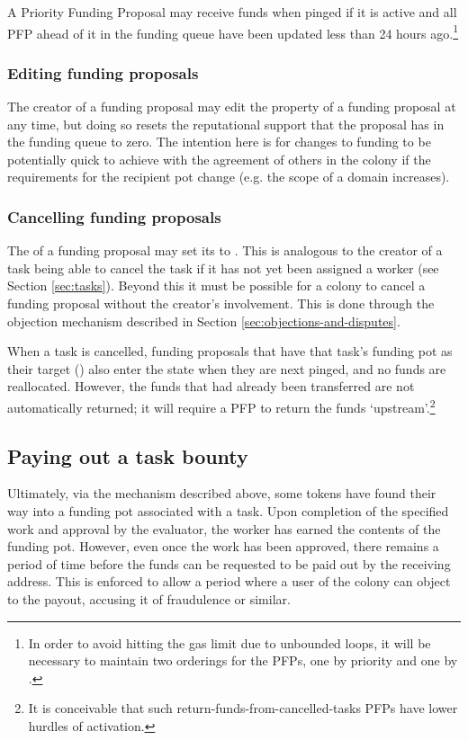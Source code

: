 A Priority Funding Proposal may receive funds when pinged if it is active and all PFP ahead of it in the funding queue have been updated less than 24 hours ago.\footnote{In order to avoid hitting the gas limit due to unbounded loops, it will be necessary to maintain two orderings for the PFPs, one by priority and one by . }

\subsubsection{Editing funding proposals}
The creator of a funding proposal may edit the  property of a funding proposal at any time, but doing so resets the reputational support that the proposal has in the funding queue to zero. The intention here is for changes to funding to be potentially quick to achieve with the agreement of others in the colony if the requirements for the recipient pot change (e.g. the scope of a domain increases).

\subsubsection{Cancelling funding proposals}
The  of a funding proposal may set its  to . This is analogous to the creator of a task being able to cancel the task if it has not yet been assigned a worker (see Section \ref{sec:tasks}). Beyond this it must be possible for a colony to cancel a funding proposal without the creator's involvement. This is done through the objection mechanism described in Section \ref{sec:objections-and-disputes}.

When a task is cancelled, funding proposals that have that task's funding pot as their target () also enter the  state when they are next pinged, and no funds are reallocated. However, the funds that had already been transferred are not automatically returned; it will require a PFP to return the funds `upstream'.\footnote{It is conceivable that such return-funds-from-cancelled-tasks PFPs have lower hurdles of activation.}

\subsection{Paying out a task bounty}\label{sec:claiming-bounty}
Ultimately, via the mechanism described above, some tokens have found their way into a funding pot associated with a task. Upon completion of the specified work and approval by the evaluator, the worker has earned the contents of the funding pot. However, even once the work has been approved, there remains a period of time before the funds can be requested to be paid out by the receiving address. This is enforced to allow a period where a user of the colony can object to the payout, accusing it of fraudulence or similar.

